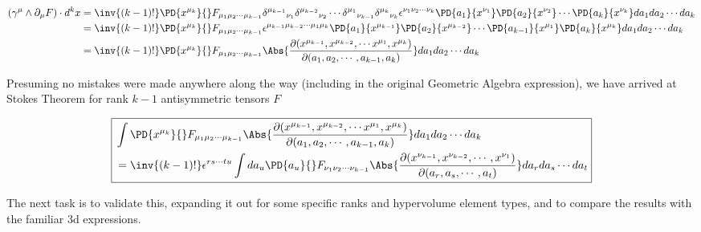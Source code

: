 \begin{align*}
(\gamma^\mu \wedge \partial_\mu F) \cdot d^k x 
&=
\inv{(k-1)!}\PD{x^{\mu_k}}{} F_{\mu_1 \mu_2 \cdots \mu_{k-1}}
{\delta^{\mu_{k-1}}}_{\nu_1}  {\delta^{ \mu_{k-2} }}_{\nu_2}  \cdots  
{\delta^{\mu_{1}} }_{\nu_{k-1}}
{\delta^{\mu_{k}} }_{\nu_{k}}
\epsilon^{\nu_1 \nu_2 \cdots \nu_{k}}
\PD{a_1}{x^{\nu_1}}
\PD{a_2}{x^{\nu_2}}
\cdots
\PD{a_k}{x^{\nu_{k}}}
da_1 da_2 \cdots da_k \\
&=
\inv{(k-1)!}\PD{x^{\mu_k}}{} F_{\mu_1 \mu_2 \cdots \mu_{k-1}}
\epsilon^{\mu_{k-1} \mu_{k-2} \cdots \mu_1 \mu_{k}}
\PD{a_1}{x^{\mu_{k-1}}}
\PD{a_2}{x^{\mu_{k-2}}}
\cdots
\PD{a_{k-1}}{x^{\mu_{1}}}
\PD{a_k}{x^{\mu_{k}}}
da_1 da_2 \cdots da_k \\
&=
\inv{(k-1)!}\PD{x^{\mu_k}}{} F_{\mu_1 \mu_2 \cdots \mu_{k-1}}
\Abs{\frac{\partial(
x^{\mu_{k-1}},
x^{\mu_{k-2}},
\cdots
x^{\mu_{1}},
x^{\mu_{k}}
)}{\partial(a_1, a_2, \cdots, a_{k-1}, a_k)}
}
da_1 da_2 \cdots da_k \\
\end{align*}

Presuming no mistakes were made anywhere along the way (including in the original Geometric Algebra expression), we have arrived at Stokes Theorem for rank $k-1$ antisymmetric tensors $F$

\begin{equation}\label{eqn:antisymmetricTensorTx:650}
\boxed{
\begin{aligned}
&\int
\PD{x^{\mu_k}}{} F_{\mu_1 \mu_2 \cdots \mu_{k-1}}
\Abs{\frac{\partial(
x^{\mu_{k-1}},
x^{\mu_{k-2}},
\cdots
x^{\mu_{1}},
x^{\mu_{k}}
)}{\partial(a_1, a_2, \cdots, a_{k-1}, a_k)}
}
da_1 da_2 \cdots da_k \\
&=
\inv{(k-1)!} \epsilon^{ r s \cdots t u } \int da_u \PD{a_{u}}{} F_{\nu_1 \nu_2 \cdots \nu_{k-1} }
\Abs{\frac{\partial(
x^{\nu_{k-1}},x^{\nu_{k-2}},\cdots,x^{\nu_1}
)}{\partial(a_r, a_s, \cdots, a_t)}}
da_r da_s \cdots da_t 
\end{aligned}
}
\end{equation}

The next task is to validate this, expanding it out for some specific ranks and hypervolume element types, and to compare the results with the familiar 3d expressions.

\EndArticle
